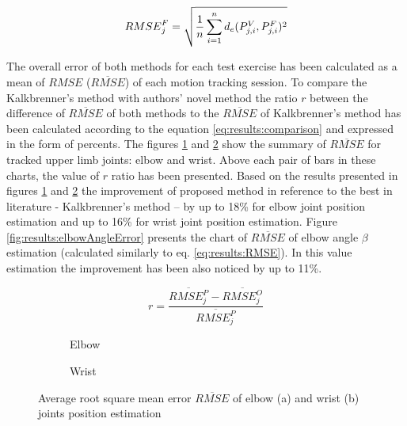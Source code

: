 \documentclass[sensors,article,submit,moreauthors,pdftex,10pt,a4paper]{mdpi}
\begin{document}
\begin{equation}
	\centering
	{RMSE}^F_j = \sqrt{\frac{1}{n}\sum_{i=1}^{n}{d_e(P^V_{j,i}, P^F_{j,i})^2}}
	\label{eq:results:RMSE}
\end{equation}

The overall error of both methods for each test exercise has been calculated as a mean of $RMSE$ ($\overline{RMSE}$) of each motion tracking session. To compare the Kalkbrenner’s method with authors’ novel method the ratio $r$ between the difference of $\overline{RMSE}$ of both methods to the $\overline{RMSE}$ of Kalkbrenner’s method has been calculated according to the equation \ref{eq:results:comparison} and expressed in the form of percents. The figures \ref{fig:results:positionError:a} and \ref{fig:results:positionError:b} show the summary of  $\overline{RMSE}$ for tracked upper limb joints: elbow and wrist. Above each pair of bars in these charts, the value of $r$ ratio has been presented. Based on the results presented in figures \ref{fig:results:positionError:a} and \ref{fig:results:positionError:b} the improvement of proposed method in reference to the best in literature - Kalkbrenner’s method – by up to 18\% for elbow joint position estimation and up to 16\% for wrist joint position estimation. Figure \ref{fig:results:elbowAngleError} presents the chart of $\overline{RMSE}$ of elbow angle $\beta$ estimation (calculated similarly to eq. \ref{eq:results:RMSE}). In this value estimation the improvement has been also noticed by up to 11\%.

\begin{equation}
	r = \frac{\overline{RMSE^P_j} - \overline{RMSE^O_j}}{\overline{RMSE^P_j}}
	\label{eq:results:comparison}
\end{equation}

\begin{figure}[H]
	\centering
	\begin{subfigure}[b]{0.49\textwidth}
		\centering
		
		\caption{Elbow}
		\label{fig:results:positionError:a}
	\end{subfigure} \hfill
	\begin{subfigure}[b]{0.49\textwidth}
		\centering
		
		\caption{Wrist}
		\label{fig:results:positionError:b}
	\end{subfigure}
	\caption{Average root square mean error $\overline{RMSE}$ of elbow (a) and wrist (b) joints position estimation}
	\label{fig:results:positionError}
\end{figure}   
\end{document}
